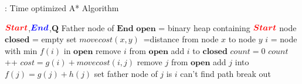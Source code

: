 \documentclass{article}
\begin{document}
\begin{CJK*}{GBK}{song}
\begin{algorithm}[h]
        \caption{: Time optimized A* Algorithm}
        \begin{algorithmic}[1] %
            \Require ${\color{red}{\boldsymbol{Start}}}$,${\color{blue}{\boldsymbol{End}}}$,$\boldsymbol{Q}$
            \Ensure Father node of $\boldsymbol{End}$
                \State $\boldsymbol{open}$   = binary heap containing  ${\color{red}{\boldsymbol{Start}}}$ node
                \State $\boldsymbol{closed}$ = empty set
                \State $movecost(x,y)$  \,=\quad distance from node $x$ to node $y$
                    \State $i$ = node with min $f(i)$ in $\boldsymbol{open}$
                    \State remove $i$ from $\boldsymbol{open}$
                    \State add $i$ to $\boldsymbol{closed}$
                    \State $count = 0 $
                        \State $count $++
                        \State $cost = g(i) + movecost(i,j)$
                                \State remove $j$ from $\boldsymbol{open}$
                            \EndIf
                                \State add $j$ into {}
                                \State $f(j) = g(j) + h(j)$
                                \State set father node of $j$ is $i$
                            \EndIf
                     \EndFor
                                \State can't find path
                                \State break out
                     \EndIf
                 \EndWhile
            \EndFunction
        \end{algorithmic}
    \end{algorithm}


\end{CJK*}
\end{document}
